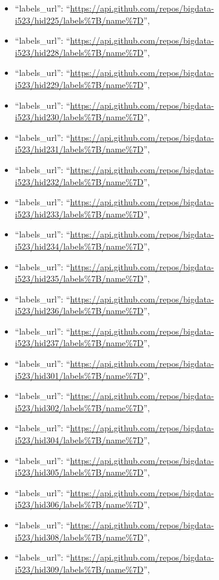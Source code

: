 \begin{itemize}
\item
  ``labels\_url'':
  ``\url{https://api.github.com/repos/bigdata-i523/hid225/labels\%7B/name\%7D}'',
\item
  ``labels\_url'':
  ``\url{https://api.github.com/repos/bigdata-i523/hid228/labels\%7B/name\%7D}'',
\item
  ``labels\_url'':
  ``\url{https://api.github.com/repos/bigdata-i523/hid229/labels\%7B/name\%7D}'',
\item
  ``labels\_url'':
  ``\url{https://api.github.com/repos/bigdata-i523/hid230/labels\%7B/name\%7D}'',
\item
  ``labels\_url'':
  ``\url{https://api.github.com/repos/bigdata-i523/hid231/labels\%7B/name\%7D}'',
\item
  ``labels\_url'':
  ``\url{https://api.github.com/repos/bigdata-i523/hid232/labels\%7B/name\%7D}'',
\item
  ``labels\_url'':
  ``\url{https://api.github.com/repos/bigdata-i523/hid233/labels\%7B/name\%7D}'',
\item
  ``labels\_url'':
  ``\url{https://api.github.com/repos/bigdata-i523/hid234/labels\%7B/name\%7D}'',
\item
  ``labels\_url'':
  ``\url{https://api.github.com/repos/bigdata-i523/hid235/labels\%7B/name\%7D}'',
\item
  ``labels\_url'':
  ``\url{https://api.github.com/repos/bigdata-i523/hid236/labels\%7B/name\%7D}'',
\item
  ``labels\_url'':
  ``\url{https://api.github.com/repos/bigdata-i523/hid237/labels\%7B/name\%7D}'',
\item
  ``labels\_url'':
  ``\url{https://api.github.com/repos/bigdata-i523/hid301/labels\%7B/name\%7D}'',
\item
  ``labels\_url'':
  ``\url{https://api.github.com/repos/bigdata-i523/hid302/labels\%7B/name\%7D}'',
\item
  ``labels\_url'':
  ``\url{https://api.github.com/repos/bigdata-i523/hid304/labels\%7B/name\%7D}'',
\item
  ``labels\_url'':
  ``\url{https://api.github.com/repos/bigdata-i523/hid305/labels\%7B/name\%7D}'',
\item
  ``labels\_url'':
  ``\url{https://api.github.com/repos/bigdata-i523/hid306/labels\%7B/name\%7D}'',
\item
  ``labels\_url'':
  ``\url{https://api.github.com/repos/bigdata-i523/hid308/labels\%7B/name\%7D}'',
\item
  ``labels\_url'':
  ``\url{https://api.github.com/repos/bigdata-i523/hid309/labels\%7B/name\%7D}'',

\end{itemize}
